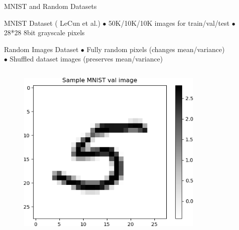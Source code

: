 \documentclass{beamer}
\begin{document}
\begin{frame}{MNIST and Random Datasets}
    \begin{block}{MNIST Dataset \tiny{(\cite{lecun-mnisthandwrittendigit-2010} LeCun et al.)} }
    $\bullet$ 50K/10K/10K images for train/val/test $\bullet$ 28*28 8bit grayscale pixels\\ 
    \end{block}
    \begin{block}{Random Images Dataset}
    $\bullet$ Fully random pixels (changes mean/variance)\\
    $\bullet$ Shuffled dataset images (preserves mean/variance)\\ 
    \end{block}
    
    \begin{columns}
    \begin{column}{.33\textwidth}
    \begin{figure}
        \centering
        \includegraphics[width=.99\textwidth]{images/mnist-behavior/MNIST-Sample.png}
    \end{figure}
    \end{column}
    \begin{column}{.33\textwidth}
    \begin{figure}
        \centering

\end{figure}
\end{column}
\end{columns}
\end{frame}
\end{document}
